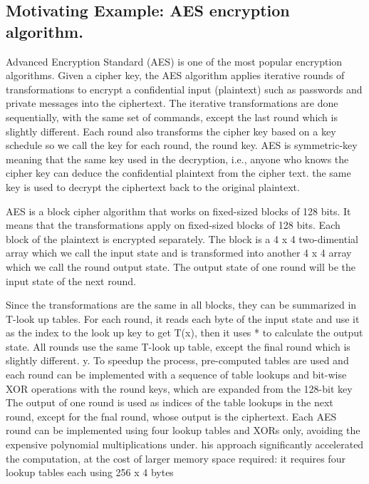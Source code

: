 \subsection{Motivating Example: AES encryption algorithm.}

%
Advanced Encryption Standard (AES) is one of the most popular encryption algorithms.
%
Given a cipher key, the AES algorithm applies iterative rounds of transformations  to encrypt a confidential input (plaintext) such as passwords and private messages into the ciphertext.
%
The iterative transformations are done sequentially, with the same set of commands, except the last round which is slightly different. 
%
Each round also transforms the cipher key based on a key schedule so we call the key for each round, the round key. 
%
AES is symmetric-key meaning that the same key used in the decryption, i.e., anyone who knows the cipher key can deduce the confidential plaintext from the cipher text. 
%
the same key is used to decrypt the ciphertext back to the original plaintext.

AES is a block cipher algorithm that works on fixed-sized blocks of 128 bits.
%
It means that the transformations apply on fixed-sized blocks of 128 bits.
%
Each block of the plaintext is encrypted separately.
%
The block is a 4 x 4 two-dimential array which we call the input state and is transformed into another 4 x 4 array  which we call the round output state.
%
The output state of one round will be the input state of the next round.
%


Since the transformations are the same in all blocks, they can be summarized in T-look up tables.
%
For each round, it reads each byte of the input state and use it as the index to the look up key to get T(x), then it uses * to calculate the output state. 
%
All rounds use the same T-look up table, except the final round which is slightly different.
%
y. To speedup the process,
pre-computed tables are used and each round can be implemented with a sequence of table lookups and bit-wise XOR
operations with the round keys, which are expanded from
the 128-bit key
The output of one round is used as indices of the table lookups in the next round, except for the
fnal round, whose output is the ciphertext.
Each AES round can be implemented using four lookup
tables and XORs only, avoiding the expensive polynomial multiplications under.
his approach significantly accelerated
the computation, at the cost of larger memory space required: it
requires four lookup tables each using 256 x 4 bytes

